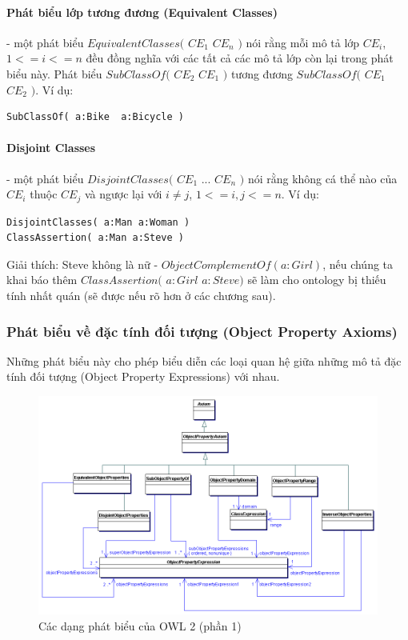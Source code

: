 \paragraph{Phát biểu lớp tương đương (Equivalent Classes)} - một phát biểu $EquivalentClasses($ $CE_{1}$ $CE_{n}$ $)$ nói rằng mỗi mô tả lớp $CE_{i}$, $1<=i<=n$ đều đồng nghĩa với các tất cả các mô tả lớp còn lại trong phát biểu này. Phát biểu $SubClassOf($ $CE_{2}$ $CE_{1}$ $)$ tương đương $SubClassOf($ $CE_{1}$ $CE_{2}$ $)$. Ví dụ:
\begin{verbatim}
SubClassOf( a:Bike  a:Bicycle )
\end{verbatim}

\paragraph{Disjoint Classes} - một phát biểu $DisjointClasses($ $CE_{1}$ ... $CE_{n}$ $)$ nói rằng không cá thể nào của $CE_{i}$ thuộc $CE_{j}$ và ngược lại với $i \neq j$, $1<=i,j<=n$. Ví dụ:
\begin{verbatim}
DisjointClasses( a:Man a:Woman )	
ClassAssertion( a:Man a:Steve )
\end{verbatim}
Giải thích: Steve không là nữ - $ObjectComplementOf( a:Girl )$, nếu chúng ta khai báo thêm $ClassAssertion($ $a:Girl$ $a:Steve)$ sẽ làm cho ontology bị thiếu tính nhất quán (sẽ được nếu rõ hơn ở các chương sau).

\subsubsection{Phát biểu về đặc tính đối tượng (Object Property Axioms)}
Những phát biểu này cho phép biểu diễn các loại quan hệ giữa những mô tả đặc tính đối tượng (Object Property Expressions) với nhau.
\begin{figure}[h]
	\centering
	\includegraphics[width=120mm]{Figures/objectpropertyAxiom.png}
	\caption{Các dạng phát biểu của OWL 2 (phần 1)\label{overflow}}
\end{figure}

